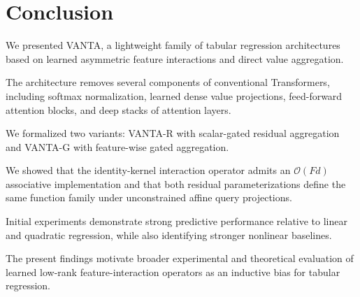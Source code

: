 \documentclass[11pt,a4paper]{article}
\begin{document}
\section{Conclusion}

We presented VANTA, a lightweight family
of tabular regression architectures
based on learned asymmetric feature
interactions and direct value aggregation.

The architecture removes several
components of conventional Transformers,
including softmax normalization,
learned dense value projections,
feed-forward attention blocks, and
deep stacks of attention layers.

We formalized two variants:
VANTA-R with scalar-gated residual
aggregation and VANTA-G with
feature-wise gated aggregation.

We showed that the identity-kernel
interaction operator admits an
$\mathcal{O}(Fd)$ associative
implementation and that both residual
parameterizations define the same
function family under unconstrained
affine query projections.

Initial experiments demonstrate
strong predictive performance relative
to linear and quadratic regression,
while also identifying stronger
nonlinear baselines.

The present findings motivate broader
experimental and theoretical evaluation
of learned low-rank feature-interaction
operators as an inductive bias
for tabular regression.

\end{document}
